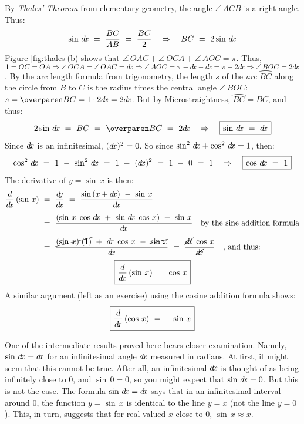 \noindent By \emph{Thales' Theorem} from elementary
geometry, the angle $\angle\,ACB$ is a right angle. Thus:
\begin{displaymath}
 \sin\,d\!x ~=~ \frac{BC}{AB} ~=~ \frac{BC}{2} \quad\Rightarrow\quad
 BC ~=~ 2\sin\,d\!x
\end{displaymath}
Figure \ref{fig:thales}(b) shows that $\angle\,OAC + \angle\,OCA +
\angle\,AOC = \pi$. Thus, $1=OC=OA \Rightarrow \angle\,OCA = \angle\,OAC = d\!x
\Rightarrow \angle\,AOC = \pi-d\!x-d\!x = \pi-2d\!x \Rightarrow
\angle\,BOC = 2d\!x$.
By the arc length formula from trigonometry, the length $s$ of the
\emph{arc} $\wideparen{BC}$ along the circle from $B$ to $C$ is the
radius times the central angle $\angle\,BOC$: $s = \wideparen{BC} = 1 \cdot 2\dx
= 2\dx$. But by Microstraightness, $\wideparen{BC} = BC$, and thus:
\begin{displaymath}
 2\sin\,\dx ~=~ BC ~=~ \wideparen{BC} ~=~ 2\dx \quad\Rightarrow\quad
 \setlength{\fboxsep}{4pt}\boxed{\sin\,\dx ~=~ \dx}
\end{displaymath}
Since $d\!x$ is an infinitesimal, $( d\!x )^2 = 0$. So since $\sin^2 \,d\!x +
\cos^2 \,d\!x = 1$, then:
\begin{displaymath}
 \cos^2 \,\dx ~=~ 1 ~-~ \sin^2 \,\dx ~=~ 1 ~-~ ( \dx )^2 ~=~ 1 ~-~ 0 ~=~ 1
 \quad\Rightarrow\quad \setlength{\fboxsep}{4pt}\boxed{\cos\,\dx ~=~ 1}
\end{displaymath}
The derivative of $y=\sin\,x$ is then:
\begin{align*}
 \ddx \,(\sin\,x) ~&=~ \dydx ~=~ \frac{\sin\,(x+\dx) ~-~
  \sin\,x}{\dx}\\[4pt]
 &=~ \frac{(\sin\,x\;\cos\,\dx ~+~ \sin\,\dx\;\cos\,x) ~-~ \sin\,x}{\dx} \quad
  \text{by the sine addition formula}\\[4pt]
 &=~ \frac{\cancel{(\sin\,x)\;(1)} ~+~ \dx\;\cos\,x ~-~ \cancel{\sin\,x}}{\dx}
  ~=~ \frac{\cancel{\dx}\;\cos\,x}{\cancel{\dx}} \quad\text{, and thus:}
 \end{align*}
\begin{displaymath}
 \setlength{\fboxsep}{4pt}\boxed{\ddx \,(\sin\,x) ~=~ \cos\,x}
\end{displaymath}
\newpage
A similar argument (left as an exercise) using the cosine addition formula
shows:
\begin{displaymath}
 \setlength{\fboxsep}{4pt}\boxed{\ddx \,(\cos\,x) ~=~ -\sin\,x}
\end{displaymath}

One of the intermediate results proved here bears closer examination. Namely,
$\sin\,d\!x = d\!x$ for an infinitesimal angle $d\!x$ measured in radians. At
first, it might seem that this cannot be true. After all, an infinitesimal $d\!x$
is thought of as being infinitely close to 0, and $\sin\,0 = 0$, so
you might expect that $\sin\,d\!x = 0$. But this is not the case. The formula
$\sin\,d\!x = d\!x$ says that in an infinitesimal interval around 0, the function
$y=\sin\,x$ is identical to the line $y=x$ (not the line $y=0$). This, in turn,
suggests that for real-valued $x$ close to $0$, $\sin\,x \approx x$.

